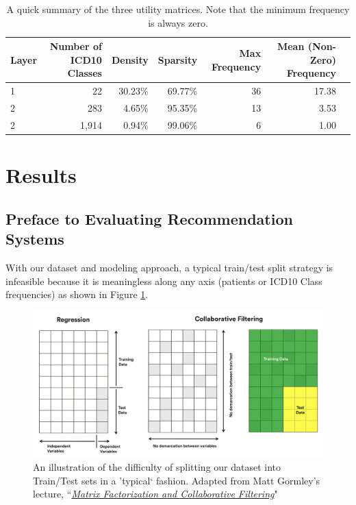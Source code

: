 \documentclass[twoside,11pt]{article}
\begin{document}
{\begin{table}[H]
  \centering
  \begin{tabular}{|l|r|r|r|r|r|r|}
      \hline
    \textbf{Layer} & Number of ICD10 \textbf{Classes} & \textbf{Density} & \textbf{Sparsity} & \textbf{Max} Frequency & \textbf{Mean} (Non-Zero) Frequency \\
    \hline
    \hline
    1 & 22 & 30.23\% & 69.77\% & 36 & 17.38 \\
    \hline
    2 & 283 & 4.65\% & 95.35\% & 13 & 3.53 \\
    \hline
    2 & 1,914 & 0.94\% & 99.06\% & 6 & 1.00 \\
    \hline
  \end{tabular}
  \caption{A quick summary of the three utility matrices. Note that the minimum frequency is always zero.}
  \label{table:data-matrix}
\end{table}

\newpage
\section{Results}

\subsection{Preface to Evaluating Recommendation Systems}

With our dataset and modeling approach, a typical train/test split strategy is infeasible because it is meaningless along any axis (patients or ICD10 Class frequencies) as shown in Figure \ref{fig:compare_regression_train_test}.

\begin{figure}[H]
	\begin{adjustwidth}{-4em}{}
		\includegraphics[width=1.17\textwidth]{./images/regression-cf.png}
	\end{adjustwidth}
	\caption{An illustration of the difficulty of splitting our dataset into Train/Test sets in a 'typical` fashion. Adapted from Matt Gormley's lecture, ``\textit{\href{https://www.cs.cmu.edu/~mgormley/courses/10601-s17/slides/lecture25-mf.pdf}{Matrix Factorization and Collaborative Filtering}}"}
	\label{fig:compare_regression_train_test}
\end{figure}

}
\end{document}
